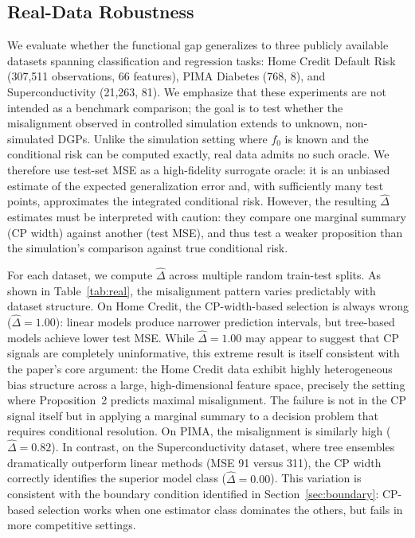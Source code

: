 \documentclass[pdflatex,sn-mathphys-ay]{sn-jnl}%
\theoremstyle{thmstyleone}%
\theoremstyle{thmstyletwo}%
\theoremstyle{thmstylethree}%
\begin{document}
\subsection{Real-Data Robustness}
\label{sec:real-data}

We evaluate whether the functional gap generalizes to three publicly available datasets spanning classification and regression tasks: Home Credit Default Risk (307,511 observations, 66 features), PIMA Diabetes (768, 8), and Superconductivity (21,263, 81). We emphasize that these experiments are not intended as a benchmark comparison; the goal is to test whether the misalignment observed in controlled simulation extends to unknown, non-simulated DGPs. Unlike the simulation setting where $f_0$ is known and the conditional risk can be computed exactly, real data admits no such oracle. We therefore use test-set MSE as a high-fidelity surrogate oracle: it is an unbiased estimate of the expected generalization error and, with sufficiently many test points, approximates the integrated conditional risk. However, the resulting $\hat{\Delta}$ estimates must be interpreted with caution: they compare one marginal summary (CP width) against another (test MSE), and thus test a weaker proposition than the simulation's comparison against true conditional risk.

For each dataset, we compute $\hat{\Delta}$ across multiple random train-test splits. As shown in Table~\ref{tab:real}, the misalignment pattern varies predictably with dataset structure. On Home Credit, the CP-width-based selection is always wrong ($\hat{\Delta} = 1.00$): linear models produce narrower prediction intervals, but tree-based models achieve lower test MSE. While $\hat{\Delta} = 1.00$ may appear to suggest that CP signals are completely uninformative, this extreme result is itself consistent with the paper's core argument: the Home Credit data exhibit highly heterogeneous bias structure across a large, high-dimensional feature space, precisely the setting where Proposition~2 predicts maximal misalignment. The failure is not in the CP signal itself but in applying a marginal summary to a decision problem that requires conditional resolution. On PIMA, the misalignment is similarly high ($\hat{\Delta} = 0.82$). In contrast, on the Superconductivity dataset, where tree ensembles dramatically outperform linear methods (MSE 91 versus 311), the CP width correctly identifies the superior model class ($\hat{\Delta} = 0.00$). This variation is consistent with the boundary condition identified in Section~\ref{sec:boundary}: CP-based selection works when one estimator class dominates the others, but fails in more competitive settings.
\end{document}
